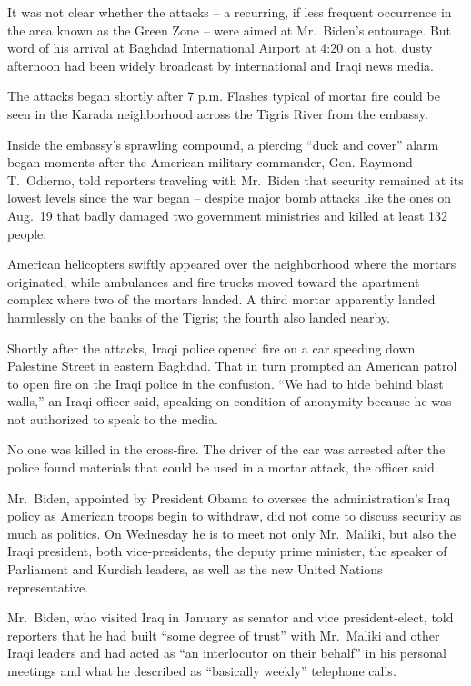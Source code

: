 ﻿\documentclass[12pt]{article}
\begin{document}
It was not clear whether the attacks -- a recurring, if less frequent occurrence in the area known
as the Green Zone -- were aimed at Mr.~Biden's entourage. But word of his arrival at Baghdad
International Airport at 4:20 on a hot, dusty afternoon had been widely broadcast by international
and Iraqi news media.

The attacks began shortly after 7 p.m. Flashes typical of mortar fire could be seen in the Karada
neighborhood across the Tigris River from the embassy.

Inside the embassy's sprawling compound, a piercing ``duck and cover'' alarm began moments after the
American military commander, Gen. Raymond T.~Odierno, told reporters traveling with Mr.~Biden that
security remained at its lowest levels since the war began -- despite major bomb attacks like the
ones on Aug.~19 that badly damaged two government ministries and killed at least 132 people.

American helicopters swiftly appeared over the neighborhood where the mortars originated, while
ambulances and fire trucks moved toward the apartment complex where two of the mortars landed. A
third mortar apparently landed harmlessly on the banks of the Tigris; the fourth also landed nearby.

Shortly after the attacks, Iraqi police opened fire on a car speeding down Palestine Street in
eastern Baghdad. That in turn prompted an American patrol to open fire on the Iraqi police in the
confusion. ``We had to hide behind blast walls,'' an Iraqi officer said, speaking on condition of
anonymity because he was not authorized to speak to the media.

No one was killed in the cross-fire. The driver of the car was arrested after the police found
materials that could be used in a mortar attack, the officer said.

Mr.~Biden, appointed by President Obama to oversee the administration's Iraq policy as American
troops begin to withdraw, did not come to discuss security as much as politics. On Wednesday he is
to meet not only Mr.~Maliki, but also the Iraqi president, both vice-presidents, the deputy prime
minister, the speaker of Parliament and Kurdish leaders, as well as the new United Nations
representative.

Mr.~Biden, who visited Iraq in January as senator and vice president-elect, told reporters that he
had built ``some degree of trust'' with Mr.~Maliki and other Iraqi leaders and had acted as ``an
interlocutor on their behalf'' in his personal meetings and what he described as ``basically
weekly'' telephone calls.
\end{document}
